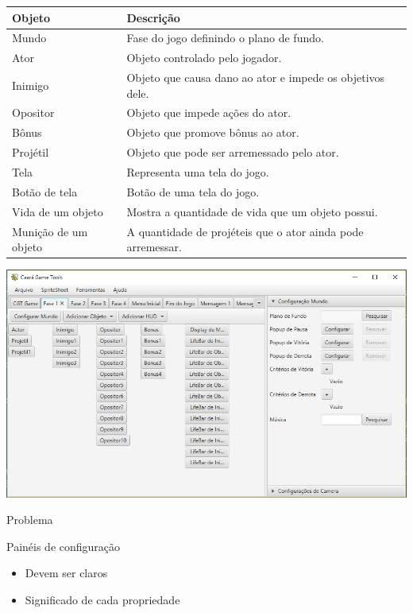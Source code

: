 \documentclass{beamer}
\begin{document}
   \begin{frame}
      \begin{tabular}{ l | p{7cm} }
      \textbf{Objeto} & \textbf{Descrição} \\
      \hline
      Mundo & Fase do jogo definindo o plano de fundo.  \\
      \hline
      Ator & Objeto controlado pelo jogador. \\
      \hline
      Inimigo & Objeto que causa dano ao ator e impede os objetivos dele. \\
      \hline
      Opositor & Objeto que impede ações do ator.  \\
      \hline
      Bônus & Objeto que promove bônus ao ator. \\
      \hline
      Projétil & Objeto que pode ser arremessado pelo ator. \\
      \hline
      Tela & Representa uma tela do jogo. \\
      \hline
      Botão de tela & Botão de uma tela do jogo. \\
      \hline
      Vida de um objeto & Mostra a quantidade de vida que um objeto possui. \\
      \hline
      Munição de um objeto & A quantidade de projéteis que o ator ainda pode arremessar. \\
   \end{tabular}

   \end{frame}

   \begin{frame}
      \includegraphics[width=\textwidth]{images/objetos_disposicao.jpg}
   \end{frame}

   \begin{frame}{Problema}
      \begin{block}{Painéis de configuração}
         \begin{itemize}
            \item<+-> Devem ser claros
            \item<+-> Significado de cada propriedade
         \end{itemize}
      \end{block}
   \end{frame}
\end{document}
